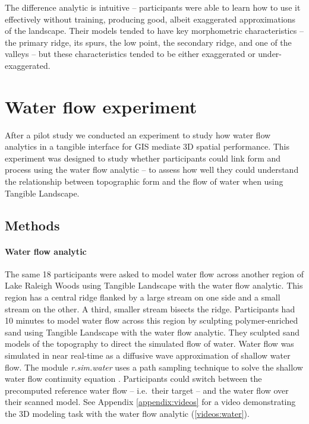 \documentclass[prodmode,acmtochi]{acmsmall} %
\begin{document}
The difference analytic is intuitive -- 
participants were able to learn how to use it effectively without training, 
producing good, albeit exaggerated approximations of the landscape. 
%
Their models tended to have key morphometric characteristics -- 
the primary ridge, its spurs, the low point, 
the secondary ridge, and one of the valleys -- 
but these characteristics tended to be 
either exaggerated or under-exaggerated.

\section{Water flow experiment}
After a pilot study \cite{Harmon2016}
we conducted an experiment to study 
how water flow analytics 
in a tangible interface for GIS
mediate 3D spatial performance.
%
This experiment was designed to study whether
participants could link form and process
using the water flow analytic -- to assess
how well they could understand the relationship 
between topographic form 
and the flow of water 
when using Tangible Landscape.

\subsection{Methods}
\paragraph{Water flow analytic}
The same 18 participants were asked to model water flow 
across another region of Lake Raleigh Woods
using Tangible Landscape with the water flow analytic.
This region has a central ridge 
flanked by a large stream on one side 
and a small stream on the other.  
A third, smaller stream bisects the ridge.
Participants had 10 minutes to model water flow across this region
by sculpting polymer-enriched sand using Tangible Landscape 
with the water flow analytic. 
They sculpted sand models of the topography
to direct the simulated flow of water.  
Water flow was simulated in near real-time 
as a diffusive wave approximation of shallow water flow.
The module \textit{r.sim.water} \cite{r.sim.water}
uses a path sampling technique to solve the shallow water flow continuity equation \cite{Mitasova2004}.
Participants could switch between the precomputed reference water flow 
-- i.e.~their target -- 
and the water flow over their scanned model.
%
See Appendix \ref{appendix:videos}
for a video demonstrating the 3D modeling task with the water flow analytic (\ref{videos:water}).
\end{document}
